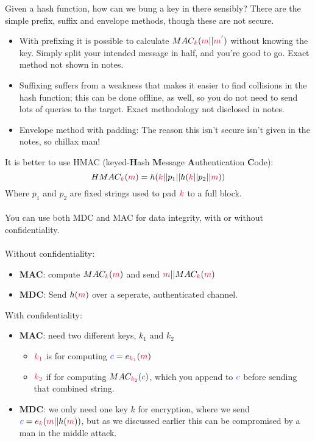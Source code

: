     Given a hash function, how can we bung a key in there sensibly? There are the simple prefix, suffix and envelope methods, though these are not secure.
    \begin{itemize}
        \item With prefixing it is possible to calculate $MAC_{\ck}(\cm||\cm^{'})$ without knowing the key. Simply split your intended message in half, and you're good to go. Exact method not shown in notes.
        \item Suffixing suffers from a weakness that makes it easier to find collisions in the hash function; this can be done offline, as well, so you do not need to send lots of queries to the target. Exact methodology not disclosed in notes.
        \item Envelope method with padding: The reason this isn't secure isn't given in the notes, so chillax man!
    \end{itemize}
    It is better to use HMAC (keyed-\textbf{H}ash \textbf{M}essage \textbf{A}uthentication \textbf{C}ode):
    $$HMAC_{\ck}(\cm) = h(\ck||p_{1}||h(\ck||p_{2}||\cm))$$
    Where $p_{1}$ and $p_{2}$ are fixed strings used to pad $\ck$ to a full block.\\
    \\
    You can use both MDC and MAC for data integrity, with or without confidentiality.\\
    \\
    Without confidentiality:
    \begin{itemize}
        \item \textbf{MAC}: compute $MAC_{\ck}(\cm)$ and send $\cm||MAC_{\ck}(\cm)$
        \item \textbf{MDC}: Send $h(\cm)$ over a seperate, authenticated channel.
    \end{itemize}
    With confidentiality:
    \begin{itemize}
        \item \textbf{MAC}: need two different keys, $k_{1}$ and $k_{2}$
        \begin{itemize}
            \item $\csubk{1}$ is for computing $\cc = e_{\csubk{1}}(\cm)$
            \item $\csubk{2}$ if for computing $MAC_{\csubk{2}}(\cc)$, which you append to $\cc$ before sending that combined string.
        \end{itemize}
        \item \textbf{MDC}: we only need one key $k$ for encryption, where we send $\cc = e_{\ck}(\cm||h(\cm))$, but as we discussed earlier this can be compromised by a man in the middle attack.
    \end{itemize}
